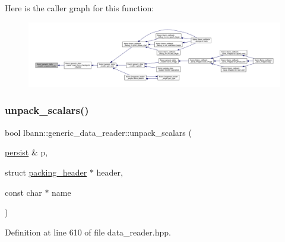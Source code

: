 Here is the caller graph for this function\+:\nopagebreak
\begin{figure}[H]
\begin{center}
\leavevmode
\includegraphics[width=350pt]{classlbann_1_1generic__data__reader_a3e1c13778c04ca9fa5136ee7ee3893fb_icgraph}
\end{center}
\end{figure}
\mbox{\label{classlbann_1_1generic__data__reader_a8de5c2e24d4cc2211145ed5dc37cf228}} 
\subsubsection{\texorpdfstring{unpack\+\_\+scalars()}{unpack\_scalars()}}
{\footnotesize\ttfamily bool lbann\+::generic\+\_\+data\+\_\+reader\+::unpack\+\_\+scalars (\begin{DoxyParamCaption}\item[{\hyperlink{classlbann_1_1persist}{persist} \&}]{p,  }\item[{struct \hyperlink{structlbann_1_1generic__data__reader_1_1packing__header}{packing\+\_\+header} $\ast$}]{header,  }\item[{const char $\ast$}]{name }\end{DoxyParamCaption})\hspace{0.3cm}{\ttfamily [inline]}}



Definition at line 610 of file data\+\_\+reader.\+hpp.


